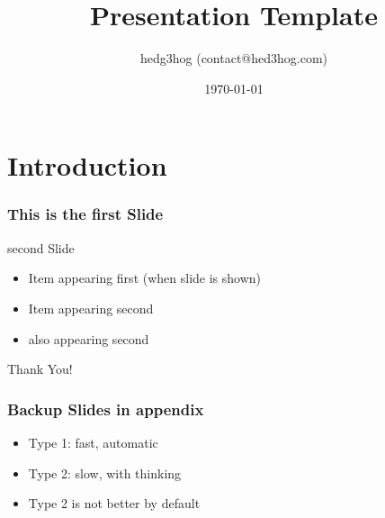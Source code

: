 \documentclass[hyperref={colorlinks=false, breaklinks}]{beamer}
\title{Presentation Template}
\author{hedg3hog (contact@hed3hog.com)}
\subtitle{}
\institute{Your institute
\\

}
\date{\today}
\begin{document}
\maketitle

\section{Introduction}


\begin{frame}
    \frametitle{This is the first Slide}\centering

\end{frame}
\begin{frame}{second Slide}
    \centering
    \begin{itemize}
        \item <1-> Item appearing first (when slide is shown)
        \item <2-> Item appearing second
        \item <2-> also appearing second
    \end{itemize}


\end{frame}

\begin{frame}
    \centering\Huge Thank You!
\end{frame}
\appendix
\begin{frame}
    \frametitle{Backup Slides in appendix}
    \centering
    \begin{itemize}
        \item Type 1: fast, automatic
        \item Type 2: slow, with thinking
        \item Type 2 is not better by default
    \end{itemize}
    \cite{kitkowska_hows_2023}
\end{frame}



\end{document}
